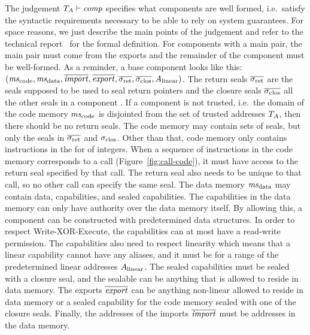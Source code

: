 \documentclass[acmsmall,review,anonymous]{acmart}\settopmatter{printfolios=true,printccs=false,printacmref=false}
\renewcommand{\comp}{\var{comp}}
\newcommand{\wdjud}[2][ ]{#1 \vdash #2}
\begin{document}
The judgement $\wdjud[\ta]{\comp}$ specifies what components are well formed, i.e.\ satisfy the syntactic requirements necessary to be able to rely on system guarantees.
For space reasons, we just describe the main points of the judgement and refer to the technical report~\citep{technical_report} for the formal definition.
For components with a main pair, the main pair must come from the exports and the remainder of the component must be well-formed.
As a reminder, a base component looks like this: $(\mscode,\msdata,\overline{\var{import}},\overline{\var{export}},\sigrets,\sigcloss,A_\linear)$.
The return seals $\sigrets$ are the seals supposed to be used to seal return pointers and the closure seals $\sigcloss$ all the other seals in a component .
If a component is not trusted, i.e.\ the domain of the code memory $\mscode$ is disjointed from the set of trusted addresses $T_{A}$, then there should be no return seals.
The code memory may contain sets of seals, but only the seals in $\sigrets$ and $\sigclos$.
Other than that, code memory only contains instructions in the for of integers.
When a sequence of instructions in the code memory corresponds to a call (Figure~\ref{fig:call-code}), it must have access to the return seal specified by that call.
The return seal also needs to be unique to that call, so no other call can specify the same seal.
The data memory $\msdata$ may contain data, capabilities, and sealed capabilities.
The capabilities in the data memory can only have authority over the data memory itself.
By allowing this, a component can be constructed with predetermined data structures.
In order to respect Write-XOR-Execute, the capabilities can at most have a read-write permission.
The capabilities also need to respect linearity which means that a linear capability cannot have any aliases, and it must be for a range of the predetermined linear addresses $A_{\mathrm{linear}}$.
The sealed capabilities must be sealed with a closure seal, and the sealable can be anything that is allowed to reside in data memory.
The exports $\overline{\mathit{export}}$ can be anything non-linear allowed to reside in data memory or a sealed capability for the code memory sealed with one of the closure seals.
Finally, the addresses of the imports $\overline{\mathit{import}}$ must be addresses in the data memory.
\end{document}

